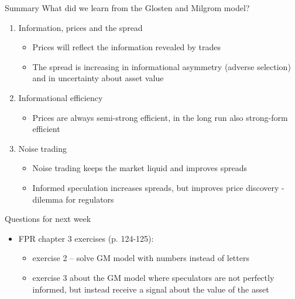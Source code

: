 \begin{frame}{Summary}
	What did we learn from the Glosten and Milgrom model?
	\begin{enumerate}
		\item Information, prices and the spread
		\begin{itemize}
			\item Prices will reflect the information revealed by trades
			\item The spread is increasing in informational asymmetry (adverse selection) and in uncertainty about asset value
		\end{itemize}
		\item Informational efficiency
		\begin{itemize}
			\item Prices are always semi-strong efficient, in the long run also strong-form efficient
		\end{itemize}
		\item Noise trading
		\begin{itemize}
			\item Noise trading keeps the market liquid and improves spreads
			\item Informed speculation increases spreads, but improves price discovery - dilemma for regulators
		\end{itemize}
	\end{enumerate}
\end{frame}


\begin{frame}{Questions for next week}
	\begin{itemize}
		\item FPR chapter 3 exercises (p. 124-125):
		\begin{itemize}
			\item exercise 2 -- solve GM model with numbers instead of letters
			\item exercise 3 about the GM model where speculators are not perfectly informed, but instead receive a signal about the value of the asset
		\end{itemize}
	\end{itemize}
\end{frame}




